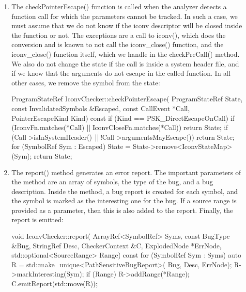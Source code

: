 \begin{enumerate}
\begin{cpp}
        if (ExplodedNode *N =
                C.generateNonFatalErrorNode(State)) {
            report(LeakedSyms, *LeakBugType,
                "Opened iconv descriptor not closed", C, N);
        }
    }
\end{cpp}

\item
The checkPointerEscape() function is called when the analyzer detects a function call for which the parameters cannot be tracked. In such a case, we must assume that we do not know if the iconv descriptor will be closed inside the function or not. The exceptions are a call to iconv(), which does the conversion and is known to not call the iconv\_close() function, and the iconv\_close() function itself, which we handle in the checkPreCall() method. We also do not change the state if the call is inside a system header file, and if we know that the arguments do not escape in the called function. In all other cases, we remove the symbol from the state:

\begin{cpp}
ProgramStateRef IconvChecker::checkPointerEscape(
        ProgramStateRef State,
        const InvalidatedSymbols &Escaped,
        const CallEvent *Call,
        PointerEscapeKind Kind) const {
    if (Kind == PSK_DirectEscapeOnCall) {
        if (IconvFn.matches(*Call) ||
            IconvCloseFn.matches(*Call))
            return State;
        if (Call->isInSystemHeader() ||
            !Call->argumentsMayEscape())
        return State;
    }
    for (SymbolRef Sym : Escaped)
        State = State->remove<IconvStateMap>(Sym);
    return State;
}
\end{cpp}

\item
The report() method generates an error report. The important parameters of the method are an array of symbols, the type of the bug, and a bug description. Inside the method, a bug report is created for each symbol, and the symbol is marked as the interesting one for the bug. If a source range is provided as a parameter, then this is also added to the report. Finally, the report is emitted:

\begin{cpp}
void IconvChecker::report(
        ArrayRef<SymbolRef> Syms, const BugType &Bug,
        StringRef Desc, CheckerContext &C,
        ExplodedNode *ErrNode,
        std::optional<SourceRange> Range) const {
    for (SymbolRef Sym : Syms) {
        auto R = std::make_unique<PathSensitiveBugReport>(
            Bug, Desc, ErrNode);
        R->markInteresting(Sym);
        if (Range)
            R->addRange(*Range);
        C.emitReport(std::move(R));
    }
}
\end{cpp}


\end{enumerate}
